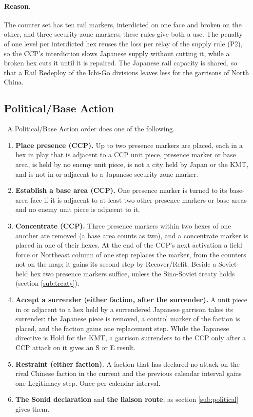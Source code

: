 \documentclass[11pt]{article}
\begin{document}
\paragraph{Reason.} The counter set has ten rail markers, interdicted on one face and broken on the other, and three security-zone markers; these rules give both a use. The penalty of one level per interdicted hex reuses the loss per relay of the supply rule (P2), so the CCP's interdiction slows Japanese supply without cutting it, while a broken hex cuts it until it is repaired. The Japanese rail capacity is shared, so that a Rail Redeploy of the Ichi-Go divisions leaves less for the garrisons of North China.

\subsection{Political/Base Action}\label{app:political}
\draft\ A Political/Base Action order does one of the following.
\begin{enumerate}
\item \textbf{Place presence (CCP).} Up to two presence markers are placed, each in a hex in play that is adjacent to a CCP unit piece, presence marker or base area, is held by no enemy unit piece, is not a city held by Japan or the KMT, and is not in or adjacent to a Japanese security zone marker.
\item \textbf{Establish a base area (CCP).} One presence marker is turned to its base-area face if it is adjacent to at least two other presence markers or base areas and no enemy unit piece is adjacent to it.
\item \textbf{Concentrate (CCP).} Three presence markers within two hexes of one another are removed (a base area counts as two), and a concentrate marker is placed in one of their hexes. At the end of the CCP's next activation a field force or Northeast column of one step replaces the marker, from the counters not on the map; it gains its second step by Recover/Refit. Beside a Soviet-held hex two presence markers suffice, unless the Sino-Soviet treaty holds (section \ref{sub:treaty}).
\item \textbf{Accept a surrender (either faction, after the surrender).} A unit piece in or adjacent to a hex held by a surrendered Japanese garrison takes its surrender: the Japanese piece is removed, a control marker of the faction is placed, and the faction gains one replacement step. While the Japanese directive is Hold for the KMT, a garrison surrenders to the CCP only after a CCP attack on it gives an S or E result.
\item \textbf{Restraint (either faction).} A faction that has declared no attack on the rival Chinese faction in the current and the previous calendar interval gains one Legitimacy step. Once per calendar interval.
\item \textbf{The Sonid declaration} and \textbf{the liaison route}, as section \ref{sub:political} gives them.
\end{enumerate}
\end{document}
